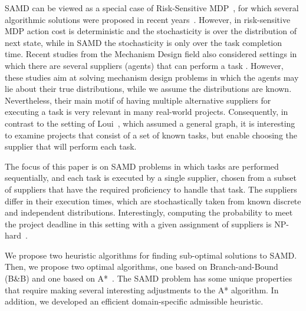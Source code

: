 \documentclass[letterpaper]{article} %
\newcommand{\samd}{\ac{SAMD}\xspace}
\newcommand{\astar}{\textsc{A*}\xspace}
\newcommand{\bnb}{\textsc{B\&B}\xspace}
\newcommand\Roni[1]{\nb{\textbf{Roni:}}{blue}{#1}}
\begin{document}
\samd can be viewed as a special case of 
Risk-Sensitive MDP~\cite{stella1998optimization}, for which several algorithmic solutions were proposed in recent years~\cite{hou2014revisiting,hou2016solving}. However, in risk-sensitive MDP action cost is deterministic and the stochasticity is over the distribution of next state, while in \samd the stochasticity is only over the task completion time. 
Recent studies from the Mechanism Design field also considered settings in which there are several suppliers (agents) that can perform a task \cite{conitzer2014mechanism,porter2008fault,zhao2020coalitional}. However, these studies aim at solving mechanism design problems in which the agents may lie about their true distributions, while we assume the distributions are known. %
Nevertheless, their main motif of having multiple alternative suppliers for executing a task is very relevant in many real-world projects. Consequently, in contrast to the setting of Loui~, which assumed a general graph, it is interesting to examine projects that consist of a set of known tasks, but enable choosing the supplier that will perform each task.




The focus of this paper is on \samd problems in which tasks are performed sequentially, and each task is executed by a single supplier, chosen from a subset of suppliers that have the required proficiency to handle that task. The suppliers differ in their execution times, which are stochastically taken from known discrete and independent distributions. 
Interestingly, computing the probability to meet the project deadline in this setting with a given assignment of suppliers is NP-hard~\cite{cohen2019estimating}.

We propose two heuristic algorithms for finding sub-optimal solutions to \samd. Then, we propose two optimal algorithms, one based on Branch-and-Bound (\bnb) and one based on \astar~\cite{hart1968formal}. The \samd problem has some unique properties that require making several interesting adjustments to the \astar algorithm. In addition, we developed an efficient domain-specific admissible heuristic. 
\end{document}
